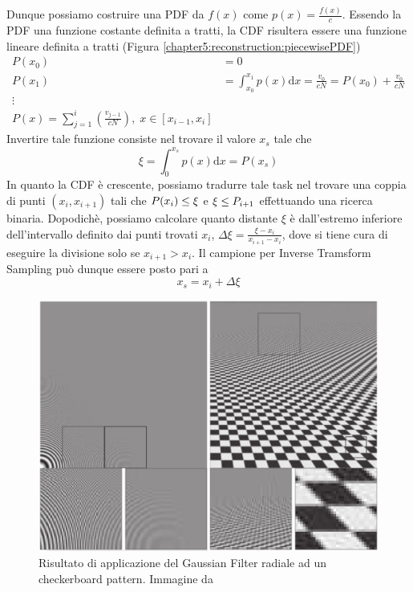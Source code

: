 Dunque possiamo costruire una PDF da $f(x)$ come $p(x)=\tfrac{f(x)}{c}$. Essendo la PDF una funzione costante definita a tratti, la CDF risultera 
essere una funzione lineare definita a tratti (Figura \ref{chapter5:reconstruction:piecewisePDF})
\begin{align}
	P(x_0)&=0\nonumber\\
	P(x_1)&=\int_{x_0}^{x_1}p(x)\mathrm{d}x=\frac{v_0}{cN}=P(x_0)+\frac{v_0}{cN}\nonumber\\
	\vdots\nonumber\\
	P(x)=\sum_{j=1}^{i}\left(\frac{v_{j-1}}{cN}\right),\;x\in[x_{i-1},x_i]
\end{align}
Invertire tale funzione consiste nel trovare il valore $x_s$ tale che
\begin{equation*}
	\xi=\int_0^{x_s}p(x)\mathrm{d}x=P(x_s)
\end{equation*}
In quanto la CDF \`e crescente, possiamo tradurre tale task nel trovare una coppia di punti $(x_i,x_{i+1})$ tali che $\mathmakebox{P(x_i)\leq\xi}$ e 
$\mathmakebox{\xi\leq P_{i+1}}$ effettuando una ricerca binaria. Dopodich\`e, possiamo calcolare quanto distante $\xi$ \`e dall'estremo inferiore 
dell'intervallo definito dai punti trovati $x_i$, $\Delta\xi=\frac{\xi-x_i}{x_{i+1}-x_i}$, dove si tiene cura di eseguire la divisione solo se
$x_{i+1}>x_i$. Il campione per Inverse Tramsform Sampling pu\`o dunque essere posto pari a 
\begin{equation}
	x_s = x_i + \Delta\xi
\end{equation}
\begin{figure}[tb]
	\centering
	\includegraphics[width=0.8\linewidth]{../assets/chapter5_reconstruction_gaussian_result.png}
	\caption{Risultato di applicazione del Gaussian Filter radiale ad un checkerboard pattern. Immagine da \cite{pegoraro}}
	\label{chapter5:reconstruction:gaussianResult}
\end{figure}
